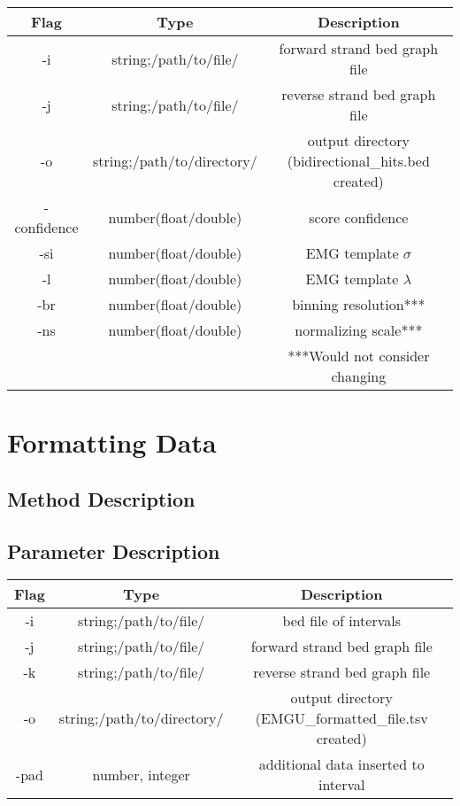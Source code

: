\documentclass{article}
\theoremstyle{definition}
\begin{document}
\begin{center}
\begin{tabular}{ |c|c|c| } 
 \hline
 Flag & Type & Description \\ 
 \hline
 \hline
 -i & string;/path/to/file/ & forward strand bed graph file \\ 
 \hline
 -j & string;/path/to/file/ & reverse strand bed graph file \\ 
 \hline
 -o & string;/path/to/directory/ & output directory (bidirectional\_hits.bed created) \\ 
 \hline
 -confidence & number(float/double) & score confidence \\ 
 \hline
 -si & number(float/double) & EMG template $\sigma$ \\ 
 \hline
 -l & number(float/double) & EMG template $\lambda$ \\ 
 \hline
 -br & number(float/double) & binning resolution*** \\ 
 \hline
-ns & number(float/double) & normalizing scale*** \\ 
 \hline
 \hline
&&***Would not consider changing\\ 
 \hline
\end{tabular}
\end{center}


\section{Formatting Data}
\subsection{Method Description}
\subsection{Parameter Description}
\begin{center}
\begin{tabular}{ |c|c|c| } 
 \hline
 Flag & Type & Description \\ 
 \hline
 \hline
 -i & string;/path/to/file/ & bed file of intervals \\ 
 \hline
 -j & string;/path/to/file/ & forward strand bed graph file \\ 
 \hline
 -k & string;/path/to/file/ & reverse strand bed graph file \\ 
 \hline
 -o & string;/path/to/directory/ & output directory (EMGU\_formatted\_file.tsv created) \\ 
 \hline
 -pad & number, integer & additional data inserted to interval \\ 
 \hline
\end{tabular}
\end{center}
\end{document}
